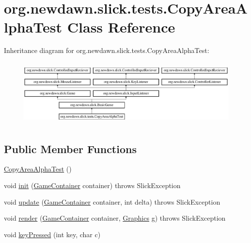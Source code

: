 \hypertarget{classorg_1_1newdawn_1_1slick_1_1tests_1_1_copy_area_alpha_test}{}\section{org.\+newdawn.\+slick.\+tests.\+Copy\+Area\+Alpha\+Test Class Reference}
\label{classorg_1_1newdawn_1_1slick_1_1tests_1_1_copy_area_alpha_test}
Inheritance diagram for org.\+newdawn.\+slick.\+tests.\+Copy\+Area\+Alpha\+Test\+:\begin{figure}[H]
\begin{center}
\leavevmode
\includegraphics[height=3.431373cm]{classorg_1_1newdawn_1_1slick_1_1tests_1_1_copy_area_alpha_test}
\end{center}
\end{figure}
\subsection*{Public Member Functions}
\begin{DoxyCompactItemize}
\item 
\mbox{\hyperlink{classorg_1_1newdawn_1_1slick_1_1tests_1_1_copy_area_alpha_test_a95cd6685fac4e989127bcaa9c008d1c0}{Copy\+Area\+Alpha\+Test}} ()
\item 
void \mbox{\hyperlink{classorg_1_1newdawn_1_1slick_1_1tests_1_1_copy_area_alpha_test_a14877413f55e6ff6cef16b2249105aad}{init}} (\mbox{\hyperlink{classorg_1_1newdawn_1_1slick_1_1_game_container}{Game\+Container}} container)  throws Slick\+Exception 
\item 
void \mbox{\hyperlink{classorg_1_1newdawn_1_1slick_1_1tests_1_1_copy_area_alpha_test_a8d99e3ef92c1464dfaa101c4ad7ec1ba}{update}} (\mbox{\hyperlink{classorg_1_1newdawn_1_1slick_1_1_game_container}{Game\+Container}} container, int delta)  throws Slick\+Exception 
\item 
void \mbox{\hyperlink{classorg_1_1newdawn_1_1slick_1_1tests_1_1_copy_area_alpha_test_a861c4d706463e2ee31d15eb576ce3864}{render}} (\mbox{\hyperlink{classorg_1_1newdawn_1_1slick_1_1_game_container}{Game\+Container}} container, \mbox{\hyperlink{classorg_1_1newdawn_1_1slick_1_1_graphics}{Graphics}} g)  throws Slick\+Exception 
\item 
void \mbox{\hyperlink{classorg_1_1newdawn_1_1slick_1_1tests_1_1_copy_area_alpha_test_ad3e659c4fc1026d613ffa7515ca21049}{key\+Pressed}} (int key, char c)
\end{DoxyCompactItemize}
